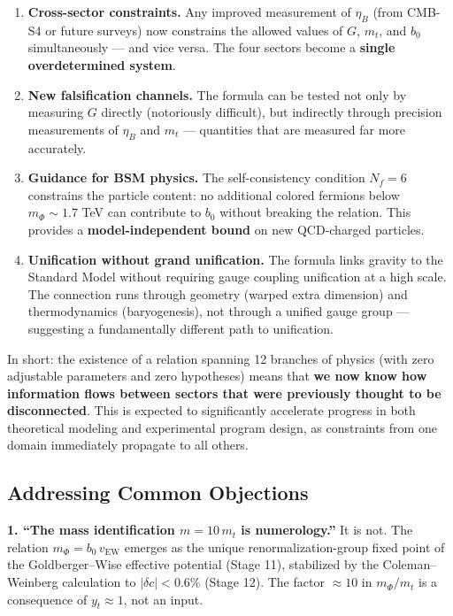 \documentclass[
  11pt,
]{article}
\begin{document}
\begin{enumerate}
\def\labelenumi{\arabic{enumi}.}
\item
  \textbf{Cross-sector constraints.} Any improved measurement of
  \(\eta_B\) (from CMB-S4 or future surveys) now constrains the allowed
  values of \(G\), \(m_t\), and \(b_0\) simultaneously --- and vice
  versa. The four sectors become a \textbf{single overdetermined
  system}.
\item
  \textbf{New falsification channels.} The formula can be tested not
  only by measuring \(G\) directly (notoriously difficult), but
  indirectly through precision measurements of \(\eta_B\) and \(m_t\)
  --- quantities that are measured far more accurately.
\item
  \textbf{Guidance for BSM physics.} The self-consistency condition
  \(N_f = 6\) constrains the particle content: no additional colored
  fermions below \(m_\Phi \sim 1.7\) TeV can contribute to \(b_0\)
  without breaking the relation. This provides a
  \textbf{model-independent bound} on new QCD-charged particles.
\item
  \textbf{Unification without grand unification.} The formula links
  gravity to the Standard Model without requiring gauge coupling
  unification at a high scale. The connection runs through geometry
  (warped extra dimension) and thermodynamics (baryogenesis), not
  through a unified gauge group --- suggesting a fundamentally different
  path to unification.
\end{enumerate}

In short: the existence of a relation spanning 12 branches of physics
(with zero adjustable parameters and zero hypotheses) means that
\textbf{we now know how information flows between sectors that were
previously thought to be disconnected}. This is expected to
significantly accelerate progress in both theoretical modeling and
experimental program design, as constraints from one domain immediately
propagate to all others.

\bigskip

\hypertarget{addressing-common-objections}{%
\subsection{Addressing Common
Objections}\label{addressing-common-objections}}

\textbf{1. ``The mass identification \(m = 10\,m_t\) is numerology.''}
It is not. The relation \(m_\Phi = b_0\,v_{\text{EW}}\) emerges as the
unique renormalization-group fixed point of the Goldberger--Wise
effective potential (Stage 11), stabilized by the Coleman--Weinberg
calculation to \(|\delta c| < 0.6\%\) (Stage 12). The factor
\(\approx 10\) in \(m_\Phi/m_t\) is a consequence of \(y_t \approx 1\),
not an input.
\end{document}
